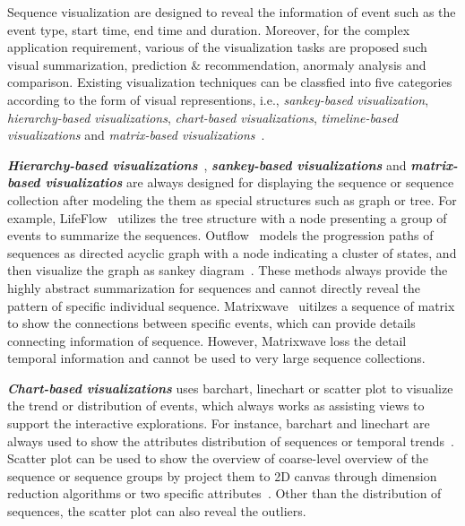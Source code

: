 Sequence visualization are designed to reveal the information of event such as the event type, start time, end time and duration. Moreover, for the complex application requirement, various of the visualization tasks are proposed such visual summarization, prediction $\&$ recommendation, anormaly analysis and comparison. Existing visualization techniques can be classfied into five categories according to the form of visual representions, i.e., \emph{sankey-based visualization}, \emph{hierarchy-based visualizations}, \emph{chart-based visualizations}, \emph{timeline-based visualizations} and \emph{matrix-based visualizations}~\cite{guo2020survey}. 

\emph{\textbf{Hierarchy-based visualizations}}~\cite{gotz2019visual}, \emph{\textbf{sankey-based visualizations}} and \emph{\textbf{matrix-based visualizatios}} are always designed for displaying the sequence or sequence collection after modeling the them as special structures such as graph or tree.
For example, LifeFlow~\cite{wongsuphasawat2011lifeflow} utilizes the tree structure with a node presenting a group of events to summarize the sequences. Outflow~\cite{wongsuphasawat2011outflow} models the progression paths of sequences as directed acyclic graph with a node indicating a cluster of states, and then visualize the graph as sankey diagram~\cite{riehmann2005interactive}.  These methods always provide the highly abstract summarization for sequences and cannot directly reveal the pattern of specific individual sequence. Matrixwave~\cite{zhao2015matrixwave} uitilzes a sequence of matrix to show the connections between specific events, which can provide details connecting information of sequence. However, Matrixwave loss the detail temporal information and cannot be used to very large sequence collections. 

\emph{\textbf{Chart-based visualizations}} uses barchart, linechart or scatter plot to visualize the trend or distribution of events, which always works as assisting views to support the interactive explorations. For instance, barchart and linechart are always used to show the attributes distribution of sequences or temporal trends~\cite{gotz2019visual, cappers2017exploring}. Scatter plot can be used to show the overview of coarse-level overview of the sequence or sequence groups by project them to 2D canvas through dimension reduction algorithms or two specific attributes~\cite{wu2020visual, malik2016high, gotz2019visual}. Other than the  distribution of sequences, the scatter plot can also reveal the outliers. 

